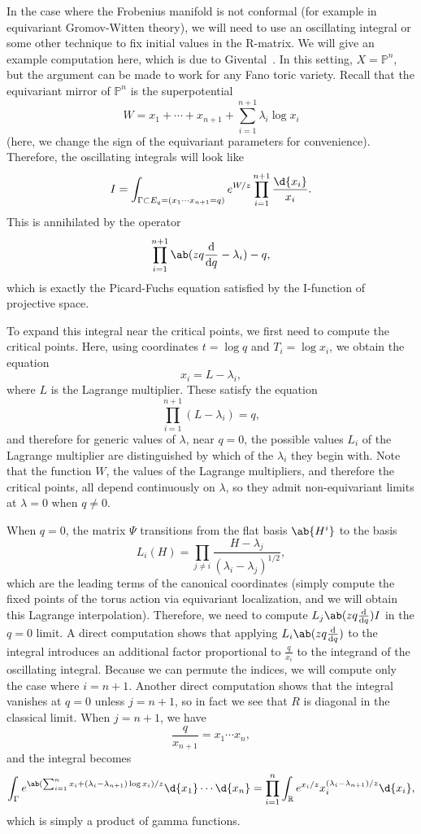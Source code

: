 \documentclass{amsart}
\theoremstyle{definition}
\theoremstyle{remark}
\theoremstyle{plain}
\theoremstyle{definition}
\theoremstyle{remark}
\newcommand{\R}{\mathbb{R}}
\renewcommand{\P}{\mathbb{P}}
\newcommand{\1}{\mathbf{1}}
\newcommand{\2}{\mathbf{2}}
\newcommand{\3}{\mathbf{3}}
\begin{document}
In the case where the Frobenius manifold is not conformal (for example in equivariant Gromov-Witten theory), we will need to use an oscillating integral or some other technique to fix initial values in the R-matrix. We will give an example computation here, which is due to Givental~\cite{Givental2001semisimple}. In this setting, \(X = \P^n\), but the argument can be made to work for any Fano toric variety. Recall that the equivariant mirror of \(\P^n\) is the superpotential
\[ W = x_1 + \cdots + x_{n+1} + \sum_{i=1}^{n+1} \lambda_i \log x_i \]
(here, we change the sign of the equivariant parameters for convenience). Therefore, the oscillating integrals will look like
\[ I = \int_{\Gamma \subset E_q = (x_1 \cdots x_{n+1}=q)} e^{W/z} \prod_{i=1}^{n+1} \frac{\d{x_i}}{x_i}. \]
This is annihilated by the operator 
\[ \prod_{i=1}^{n+1}\ab(zq \odv{}{q} -\lambda_i) - q, \]
which is exactly the Picard-Fuchs equation satisfied by the I-function of projective space.

To expand this integral near the critical points, we first need to compute the critical points. Here, using coordinates \(t = \log q\) and \(T_i = \log x_i\), we obtain the equation
\[ x_i = L - \lambda_i, \]
where \(L\) is the Lagrange multiplier. These satisfy the equation
\[ \prod_{i=1}^{n+1} (L - \lambda_i) = q, \]
and therefore for generic values of \(\lambda\), near \(q = 0\), the possible values \(L_i\) of the Lagrange multiplier are distinguished by which of the \(\lambda_i\) they begin with. Note that the function \(W\), the values of the Lagrange multipliers, and therefore the critical points, all depend continuously on \(\lambda\), so they admit non-equivariant limits at \(\lambda = 0\) when \(q \neq 0\).

When \(q = 0\), the matrix \(\Psi\) transitions from the flat basis \(\ab{H^i}\) to the basis
\[ L_i(H) = \prod_{j \neq i} \frac{H - \lambda_j}{(\lambda_i - \lambda_j)^{1/2}}, \]
which are the leading terms of the canonical coordinates (simply compute the fixed points of the torus action via equivariant localization, and we will obtain this Lagrange interpolation). Therefore, we need to compute \(L_j \ab(z q \odv{}{q}) I\) in the \(q = 0\) limit. A direct computation shows that applying \(L_i \ab(z q \odv{}{q})\) to the integral introduces an additional factor proportional to \(\frac{q}{x_i}\) to the integrand of the oscillating integral. Because we can permute the indices, we will compute only the case where \(i = n+1\). Another direct computation shows that the integral vanishes at \(q = 0\) unless \( j = n+1\), so in fact we see that \(R\) is diagonal in the classical limit. When \(j = n+1\), we have
\[ \frac{q}{x_{n+1}} = x_1 \cdots x_n, \]
and the integral becomes
\[ \int_{\Gamma} e^{\ab( \sum_{i=1}^n x_i + (\lambda_i - \lambda_{n+1})\log x_i ) / z} \d{x_1} \cdots \d{x_n} = \prod_{i=1}^n \int_{\R} e^{x_i/z} x_i^{(\lambda_i - \lambda_{n+1})/z} \d{x_i}, \]
which is simply a product of gamma functions.
\end{document}
